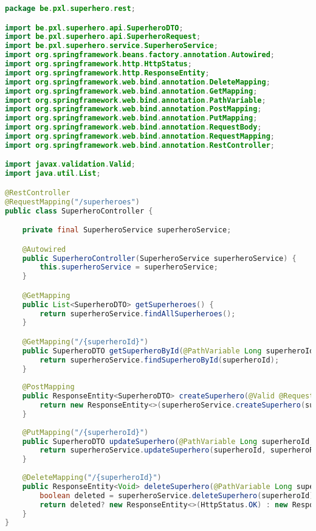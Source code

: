 \begin{lstlisting}[language=java, frame=single]
package be.pxl.superhero.rest;

import be.pxl.superhero.api.SuperheroDTO;
import be.pxl.superhero.api.SuperheroRequest;
import be.pxl.superhero.service.SuperheroService;
import org.springframework.beans.factory.annotation.Autowired;
import org.springframework.http.HttpStatus;
import org.springframework.http.ResponseEntity;
import org.springframework.web.bind.annotation.DeleteMapping;
import org.springframework.web.bind.annotation.GetMapping;
import org.springframework.web.bind.annotation.PathVariable;
import org.springframework.web.bind.annotation.PostMapping;
import org.springframework.web.bind.annotation.PutMapping;
import org.springframework.web.bind.annotation.RequestBody;
import org.springframework.web.bind.annotation.RequestMapping;
import org.springframework.web.bind.annotation.RestController;

import javax.validation.Valid;
import java.util.List;

@RestController
@RequestMapping("/superheroes")
public class SuperheroController {

	private final SuperheroService superheroService;

	@Autowired
	public SuperheroController(SuperheroService superheroService) {
		this.superheroService = superheroService;
	}

	@GetMapping
	public List<SuperheroDTO> getSuperheroes() {
		return superheroService.findAllSuperheroes();
	}

	@GetMapping("/{superheroId}")
	public SuperheroDTO getSuperheroById(@PathVariable Long superheroId) {
		return superheroService.findSuperheroById(superheroId);
	}
	
	@PostMapping
	public ResponseEntity<SuperheroDTO> createSuperhero(@Valid @RequestBody SuperheroRequest superheroRequest) {
		return new ResponseEntity<>(superheroService.createSuperhero(superheroRequest), HttpStatus.CREATED);
	}
	
	@PutMapping("/{superheroId}")
	public SuperheroDTO updateSuperhero(@PathVariable Long superheroId, @Valid @RequestBody SuperheroRequest superheroRequest) {
		return superheroService.updateSuperhero(superheroId, superheroRequest);
	}
	
	@DeleteMapping("/{superheroId}")
	public ResponseEntity<Void> deleteSuperhero(@PathVariable Long superheroId) {
		boolean deleted = superheroService.deleteSuperhero(superheroId);
		return deleted? new ResponseEntity<>(HttpStatus.OK) : new ResponseEntity<>(HttpStatus.BAD_REQUEST);
	}
}
\end{lstlisting}

